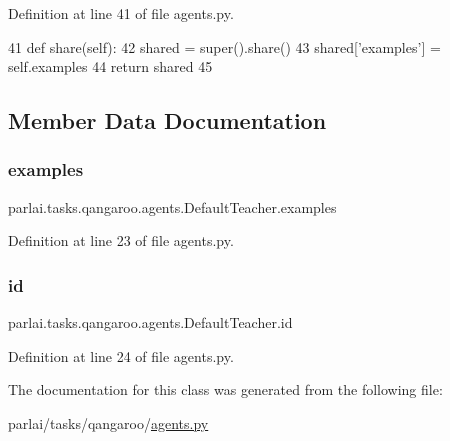 Definition at line 41 of file agents.\+py.


\begin{DoxyCode}
41     \textcolor{keyword}{def }share(self):
42         shared = super().share()
43         shared[\textcolor{stringliteral}{'examples'}] = self.examples
44         \textcolor{keywordflow}{return} shared
45 
\end{DoxyCode}


\subsection{Member Data Documentation}
\mbox{\label{classparlai_1_1tasks_1_1qangaroo_1_1agents_1_1DefaultTeacher_a3dcc14aaea5fa95b3d878c6c3a2e9e11}} 
\subsubsection{\texorpdfstring{examples}{examples}}
{\footnotesize\ttfamily parlai.\+tasks.\+qangaroo.\+agents.\+Default\+Teacher.\+examples}



Definition at line 23 of file agents.\+py.

\mbox{\label{classparlai_1_1tasks_1_1qangaroo_1_1agents_1_1DefaultTeacher_a4d036962beeb5b5d446bf04327e49014}} 
\subsubsection{\texorpdfstring{id}{id}}
{\footnotesize\ttfamily parlai.\+tasks.\+qangaroo.\+agents.\+Default\+Teacher.\+id}



Definition at line 24 of file agents.\+py.



The documentation for this class was generated from the following file\+:\begin{DoxyCompactItemize}
\item 
parlai/tasks/qangaroo/\hyperlink{parlai_2tasks_2qangaroo_2agents_8py}{agents.\+py}\end{DoxyCompactItemize}
